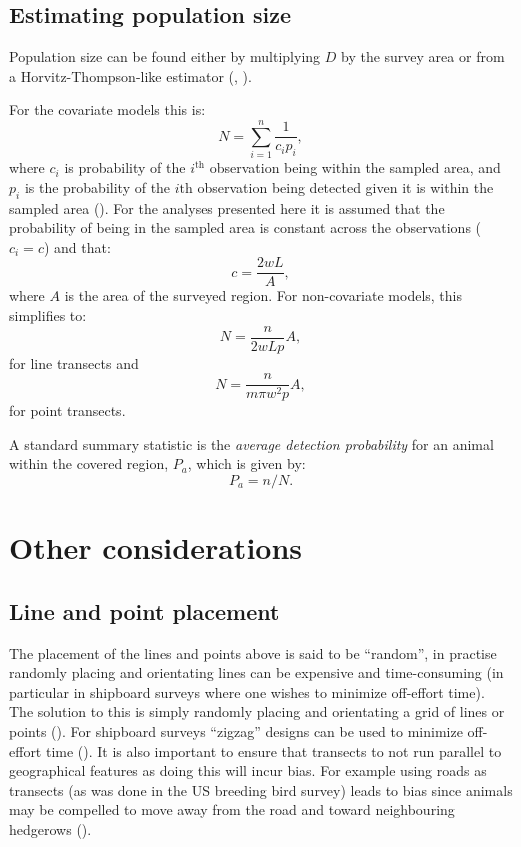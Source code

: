 \subsection{Estimating population size}
\label{intro-ds-pop-size}

Population size can be found either by multiplying $D$ by the survey area or from a Horvitz-Thompson-like estimator (\cite[pp. 53-56]{thompson}, \cite[p. 23]{ADS}).

For the covariate models this is:
\begin{equation}
N = \sum_{i=1}^n \frac{1}{c_i p_i},
\label{HT-ds-est}
\end{equation}
where $c_i$ is probability of the $i^\text{th}$ observation being within the sampled area, and $p_i$ is the probability of the $i\text{th}$ observation being detected given it is within the sampled area (\cite[p. 38]{ADS}). For the analyses presented here it is assumed that the probability of being in the sampled area is constant across the observations ($c_i=c$) and that:
\begin{equation*}
c=\frac{2wL}{A},
\end{equation*}
where $A$ is the area of the surveyed region. For non-covariate models, this simplifies to:
\begin{equation*}
N =  \frac{n}{2 w L p}A,
\end{equation*}
for line transects and
\begin{equation*}
N =  \frac{n}{m \pi w^2 p}A,
\end{equation*}
for point transects.

A standard summary statistic is the \textit{average detection probability} for an animal within the covered region, $P_a$, which is given by:
\begin{equation*}
P_a = n/N.
\end{equation*}

\section{Other considerations}

\subsection{Line and point placement}
The placement of the lines and points above is said to be ``random'', in practise randomly placing and orientating lines can be expensive and time-consuming (in particular in shipboard surveys where one wishes to minimize off-effort time). The solution to this is simply randomly placing and orientating a grid of lines or points (\cite[p. 2]{IDS}). For shipboard surveys ``zigzag'' designs can be used to minimize off-effort time (\cite{strindberg04}). It is also important to ensure that transects to not run parallel to geographical features as doing this will incur bias. For example using roads as transects (as was done in the US breeding bird survey) leads to bias since animals may be compelled to move away from the road and toward neighbouring hedgerows (\cite[p. 18]{IDS}).

